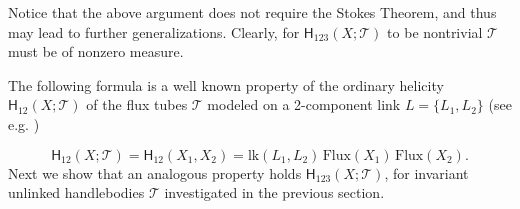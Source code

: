 \documentclass[12pt]{article}
\newcommand{\no}{\noindent}
\begin{document}
\no Notice that the above argument does not require the Stokes Theorem, and thus may lead to further generalizations. Clearly, for $\mathsf{H}_{123}(X;\mathcal{T})$ to be nontrivial $\mathcal{T}$ must be 
of nonzero measure.


 The following formula is a well known property of the ordinary helicity $\mathsf{H}_{12}(X;\mathcal{T})$ of the flux tubes $\mathcal{T}$ modeled on a 2-component link $L=\{L_1,L_2\}$ (see e.g. \cite{Laurence-Avellaneda93, Cantarella00})

\begin{equation}\label{eq:helicity12-flux-tubes}
\mathsf{H}_{12}(X;\mathcal{T})=\mathsf{H}_{12}(X_1,X_2)=\text{lk}(L_1,L_2)\,\text{Flux}(X_1)\,\text{Flux}(X_2).
\end{equation}
\no Next we show that an analogous property holds $\mathsf{H}_{123}(X;\mathcal{T})$, for invariant unlinked  handlebodies $\mathcal{T}$ investigated in the previous section.
\end{document}
